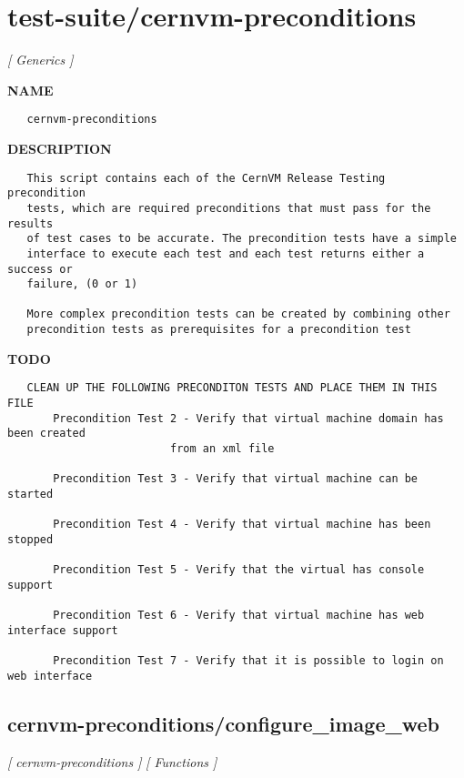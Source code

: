 \newpage
\section{test-suite/cernvm-preconditions}
\textsl{[ Generics ]}

\label{ch:robo28}
\label{ch:test_suite_cernvm_preconditions}
\textbf{NAME}
\begin{verbatim}
   cernvm-preconditions
\end{verbatim}
\textbf{DESCRIPTION}
\begin{verbatim}
   This script contains each of the CernVM Release Testing precondition
   tests, which are required preconditions that must pass for the results 
   of test cases to be accurate. The precondition tests have a simple
   interface to execute each test and each test returns either a success or 
   failure, (0 or 1)

   More complex precondition tests can be created by combining other 
   precondition tests as prerequisites for a precondition test
\end{verbatim}
\textbf{TODO}
\begin{verbatim}
   CLEAN UP THE FOLLOWING PRECONDITON TESTS AND PLACE THEM IN THIS FILE
       Precondition Test 2 - Verify that virtual machine domain has been created 
                         from an xml file

       Precondition Test 3 - Verify that virtual machine can be started

       Precondition Test 4 - Verify that virtual machine has been stopped

       Precondition Test 5 - Verify that the virtual has console support

       Precondition Test 6 - Verify that virtual machine has web interface support

       Precondition Test 7 - Verify that it is possible to login on web interface
\end{verbatim}
\newpage
\subsection{cernvm-preconditions/configure\_image\_web}
\textsl{[ cernvm-preconditions ]}
\textsl{[ Functions ]}

